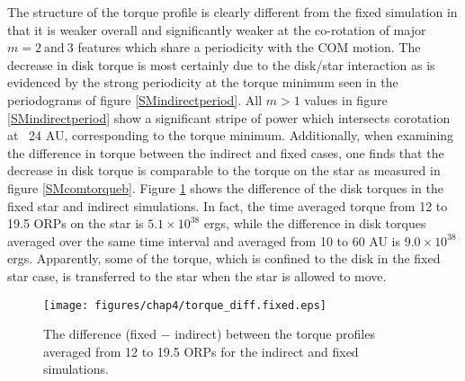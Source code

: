 The structure of the torque profile is clearly different from the fixed simulation in that it is weaker overall and significantly weaker at the co-rotation of major $m = 2~\mathrm{and}~3$ features which share a periodicity with the COM motion. The decrease in disk torque is most certainly due to the disk/star interaction as is evidenced by the strong periodicity at the torque minimum seen in the periodograms of figure \ref{SMindirectperiod}. All $m > 1$ values in figure \ref{SMindirectperiod} show a significant stripe of power which intersects corotation at ~24 AU, corresponding to the torque minimum. Additionally, when examining the difference in torque between the indirect and fixed cases, one finds that the decrease in disk torque is comparable to the torque on the star as measured in figure \ref{SMcomtorqueb}. Figure \ref{SMtorquediff} shows the difference of the disk torques in the fixed star and indirect simulations. In fact, the time averaged torque from 12 to 19.5 ORPs on the star is $5.1\times10^{38}$ ergs, while the difference in disk torques averaged over the same time interval and averaged from 10 to 60 AU is $9.0\times10^{38}$ ergs. Apparently, some of the torque, which is confined to the disk in the fixed star case, is transferred to the star when the star is allowed to move.
\begin{figure}[p]
\centering
\texttt{[image: figures/chap4/torque\_diff.fixed.eps]}
\caption[Difference of indirect and fixed run asymptotic torque profiles.]{The difference (fixed $-$ indirect) between the torque profiles averaged from 12 to 19.5 ORPs for the indirect and fixed simulations.}
\label{SMtorquediff}
\end{figure}

